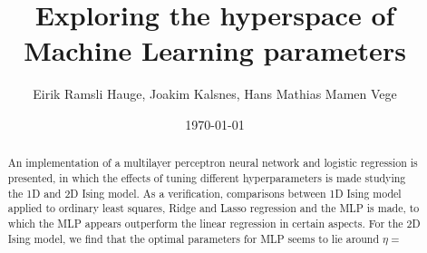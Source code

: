 \documentclass[11pt]{article}
\title{Exploring the hyperspace of Machine Learning parameters}
\author{Eirik Ramsli Hauge, Joakim Kalsnes, Hans Mathias Mamen Vege}
\date{\today}
\begin{document}
\maketitle

\begin{abstract}
An implementation of a multilayer perceptron neural network and logistic regression is presented, in which the effects of tuning different hyperparameters is made studying the 1D and 2D Ising model. As a verification, comparisons between 1D Ising model applied to ordinary least squares, Ridge and Lasso regression and the MLP is made, to which the MLP appears outperform the linear regression in certain aspects. For the 2D Ising model, we find that the optimal parameters for MLP seems to lie around $\eta=$
\end{abstract}














% 



\end{document}
